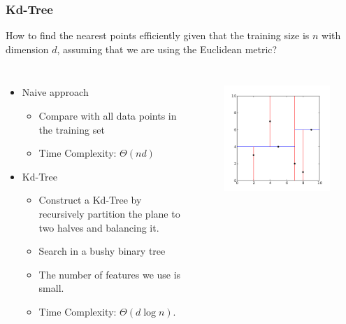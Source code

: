 \begin{frame}[fragile]
    \frametitle{Kd-Tree}
    How to find the nearest points efficiently given that the training size is $n$ with dimension $d$, assuming that we are using the Euclidean metric?
    \begin{columns}
    \begin{itemize}
        \item Naive approach
        \begin{itemize}
            \item Compare with all data points in the training set
            \item Time Complexity: $\Theta(nd)$
        \end{itemize}\pause
        \item Kd-Tree
        \begin{itemize}
            \item Construct a Kd-Tree by recursively partition the plane to two halves and balancing it.
            \item Search in a bushy binary tree
            \item The number of features we use is small.
            \item Time Complexity: $\Theta(d\log n)$.
        \end{itemize}
    \end{itemize}
    \begin{figure}
        \href{https://www.cs.princeton.edu/courses/archive/spring18/cos226/demos/99DemoKdTree.pdf#page=27}{\includegraphics[scale=0.35]{graphs/kd-tree.png}}
    \end{figure}
    \end{columns}
\end{frame}

